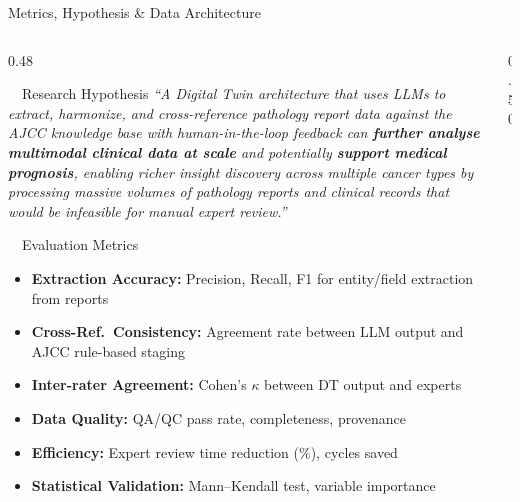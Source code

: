 \documentclass[aspectratio=169, 10pt]{beamer}
\begin{document}
\begin{frame}{Metrics, Hypothesis \& Data Architecture}

\begin{columns}[T]
\begin{column}{0.48\textwidth}

\begin{block}{\faFlask\ \ Research Hypothesis}
\tiny
\textit{``A Digital Twin architecture that uses LLMs to extract, harmonize, and cross-reference pathology report data against the AJCC knowledge base  with human-in-the-loop feedback  can \textbf{further analyse multimodal clinical data at scale} and potentially \textbf{support medical prognosis}, enabling richer insight discovery across multiple cancer types by processing massive volumes of pathology reports and clinical records that would be infeasible for manual expert review.''}
\end{block}

\vspace{2pt}
\begin{alertblock}{\faChartBar\ \ Evaluation Metrics}
\scriptsize
\begin{itemize}\setlength{\itemsep}{1pt}
    \item \textbf{Extraction Accuracy:} Precision, Recall, F1 for entity/field extraction from reports
    \item \textbf{Cross-Ref.\ Consistency:} Agreement rate between LLM output and AJCC rule-based staging
    \item \textbf{Inter-rater Agreement:} Cohen's $\kappa$ between DT output and experts
    \item \textbf{Data Quality:} QA/QC pass rate, completeness, provenance
    \item \textbf{Efficiency:} Expert review time reduction (\%), cycles saved
    \item \textbf{Statistical Validation:} Mann--Kendall test, variable importance
\end{itemize}
\end{alertblock}

\end{column}

\begin{column}{0.50\textwidth}


\end{column}
\end{columns}
\end{frame}
\end{document}
